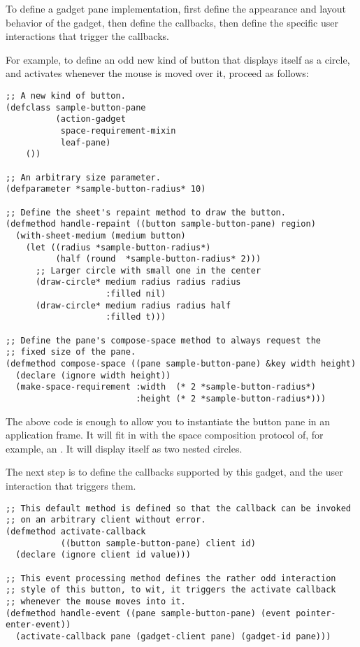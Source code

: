 To define a gadget pane implementation, first define the appearance and layout
behavior of the gadget, then define the callbacks, then define the specific user
interactions that trigger the callbacks.

For example, to define an odd new kind of button that displays itself as a
circle, and activates whenever the mouse is moved over it, proceed as follows:

\begin{verbatim}
;; A new kind of button.
(defclass sample-button-pane
          (action-gadget
           space-requirement-mixin
           leaf-pane)
    ())

;; An arbitrary size parameter.
(defparameter *sample-button-radius* 10)

;; Define the sheet's repaint method to draw the button.
(defmethod handle-repaint ((button sample-button-pane) region)
  (with-sheet-medium (medium button)
    (let ((radius *sample-button-radius*)
          (half (round  *sample-button-radius* 2)))
      ;; Larger circle with small one in the center
      (draw-circle* medium radius radius radius
                    :filled nil)
      (draw-circle* medium radius radius half
                    :filled t)))

;; Define the pane's compose-space method to always request the
;; fixed size of the pane.
(defmethod compose-space ((pane sample-button-pane) &key width height)
  (declare (ignore width height))
  (make-space-requirement :width  (* 2 *sample-button-radius*)
                          :height (* 2 *sample-button-radius*)))
\end{verbatim}

The above code is enough to allow you to instantiate the button pane in an
application frame.  It will fit in with the space composition protocol of, for
example, an .  It will display itself as two nested circles.

The next step is to define the callbacks supported by this gadget, and the user
interaction that triggers them.

\begin{verbatim}
;; This default method is defined so that the callback can be invoked
;; on an arbitrary client without error.
(defmethod activate-callback
           ((button sample-button-pane) client id)
  (declare (ignore client id value)))

;; This event processing method defines the rather odd interaction
;; style of this button, to wit, it triggers the activate callback
;; whenever the mouse moves into it.
(defmethod handle-event ((pane sample-button-pane) (event pointer-enter-event))
  (activate-callback pane (gadget-client pane) (gadget-id pane)))
\end{verbatim}


